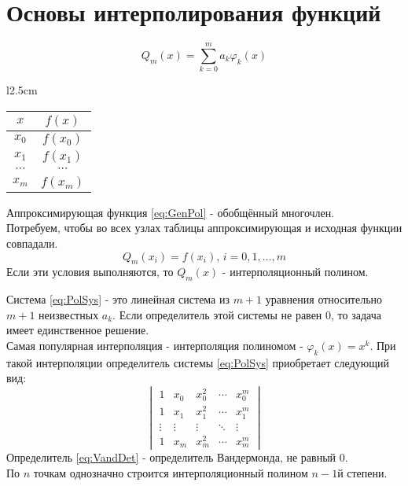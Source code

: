 \documentclass[a4paper,11pt]{article}
\begin{document}
\section{Основы интерполирования функций}
\begin{minipage}{1\linewidth}
  \begin{equation}
    Q_m(x) = \sum_{k=0}^{m} a_k \varphi_k(x)
    \label{eq:GenPol}
  \end{equation}
  \begin{wraptable}{l}{2.5cm}
    \begin{tabular}{ c|c }
      $x$ & $f(x)$ \\
      \hline
      $x_0$ & $f(x_0)$ \\
      $x_1$ & $f(x_1)$ \\
      $\cdots$ & $\cdots$ \\
      $x_m$ & $f(x_m)$
    \end{tabular}
  \end{wraptable}

  Аппроксимирующая функция \ref{eq:GenPol} - обобщённый многочлен. \\
  Потребуем, чтобы во всех узлах таблицы аппроксимирующая и исходная функции совпадали.
  \begin{equation}
    Q_m(x_i) = f(x_i), \, i = 0, 1, \dots, m
    \label{eq:PolSys}
  \end{equation}
  Если эти условия выполняются, то $Q_m(x)$ - интерполяционный полином.  
\vspace{2mm}
\end{minipage}
\newline
Система \ref{eq:PolSys} - это линейная система из $m+1$ уравнения относительно $m+1$ неизвестных $a_k$. Если определитель этой системы не равен $0$, то задача имеет единственное решение. \\
\newline
Самая популярная интерполяция - интерполяция полиномом - \(\varphi_k(x) = x^k\).
При такой интерполяции определитель системы \ref{eq:PolSys} приобретает следующий вид:
\begin{equation}
  \begin{vmatrix}
    1 & x_0 & x_0^2 & \cdots & x_0^m \\
    1 & x_1 & x_1^2 & \cdots & x_1^m \\
    \vdots & \vdots & \vdots & \ddots & \vdots \\
    1 & x_m & x_m^2 & \cdots & x_m^m
  \end{vmatrix}
  \label{eq:VandDet}
\end{equation}
Определитель \ref{eq:VandDet} - определитель Вандермонда, не равный $0$. \\
По $n$ точкам однозначно строится интерполяционный полином $n-1$й степени. \\
\end{document}
